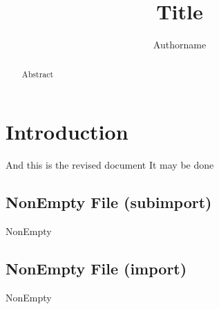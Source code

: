 \documentclass{article}
\title{Title}
\author{Authorname}
\begin{document}
\maketitle

\begin{abstract}
    Abstract
\end{abstract}

\section{Introduction}
And this is the revised document
It may be done

\subsection{NonEmpty File (subimport)}
{NonEmpty}%

\subsection{NonEmpty File (import)}
{NonEmpty}%
\end{document}

